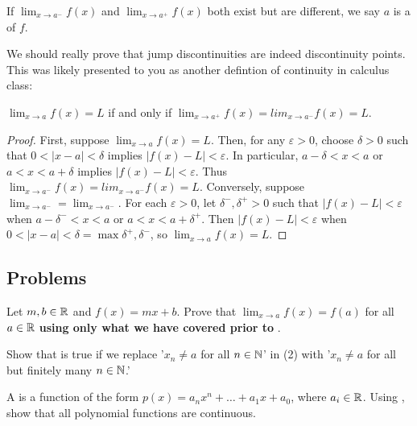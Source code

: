 \documentclass[../notes.tex]{subfiles}
\begin{document}
\begin{definition}
    If $\lim_{x\to a^-}f(x)$ and  $\lim_{x\to a^+}f(x)$ both exist but are different, we say $a$ is a  of $f$.
\end{definition}

We should really prove that jump discontinuities are indeed discontinuity points. This was likely presented to you as another defintion of continuity in calculus class: 

\begin{proposition}
    $\lim_{x\to a}f(x)=L$ if and only if $\lim_{x\to a^+}f(x)=lim_{x\to a^-}f(x)=L$.
\end{proposition}

\begin{proof}
    First, suppose $\lim_{x\to a}f(x)=L$. Then, for any $\varepsilon>0$, choose $\delta>0$ such that $0 < |x-a| < \delta$ implies $|f(x)-L| < \varepsilon$. In particular, $a- \delta < x < a$ or $a < x < a + \delta$ implies $|f(x)-L| < \varepsilon$. Thus $\lim_{x\to a^-}f(x)=lim_{x\to a^-}f(x)=L$. Conversely, suppose $\lim_{x\to a^-}=\lim_{x\to a^-}$. For each $\varepsilon>0$, let $\delta^-, \delta^+>0$ such that $|f(x)-L| < \varepsilon$ when $a-\delta^- < x < a$ or $a < x < a+\delta^+$. Then $|f(x)-L| < \varepsilon$ when $0 < |x-a| < \delta=\max{\delta^+, \delta^-}$, so  $\lim_{x\to a}f(x)=L$. 
\end{proof}

\subsection{Problems}

\begin{homework}
    Let $m,b\in \mathbb R$ and $f(x)=mx+b$. Prove that $\lim_{x\to a}f(x)=f(a)$ for all $a\in \mathbb R$ \textbf{using only what we have covered prior to }. 
\end{homework}

\begin{homework}
     Show that  is true if we replace '$x_n\neq a$ for all $n\in \mathbb N$' in (2) with  '$x_n\neq a$ for all but finitely many $n\in \mathbb N$.' 
 \end{homework}


\begin{homework}
    A  is a function of the form $p(x) = a_nx^n+\dots + a_1x+a_0$, where $a_i\in \mathbb R$. Using , show that all polynomial functions are continuous. %
\end{homework}
\end{document}
